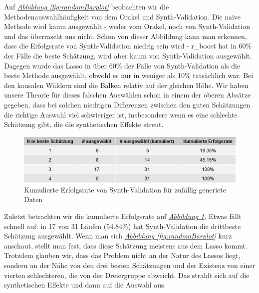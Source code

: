 \documentclass[12pt,a4paper,twoside]{scrartcl}
\numberwithin{equation}{section}
\newcommand{\reffig}[1]{\emph{\hyperref[#1]{Abbildung \ref*{#1}}}}
\begin{document}
\noindent
Auf \reffig{fig:randomBarplot} beobachten wir die Methodenauswahlhäufigkeit von dem Orakel und Synth-Validation. Die naive Methode wird kaum ausgewählt - weder vom Orakel, noch von Synth-Validation und das überrascht uns nicht. Schon von dieser Abbildung kann man erkennen, dass die Erfolgsrate von Synth-Validation niedrig sein wird - r\_boost hat in 60\% der Fälle die beste Schätzung, wird aber kaum von Synth-Validation ausgewählt. Dagegen wurde das Lasso in über 60\% der Fälle von Synth-Validation als die beste Methode ausgewählt, obwohl es nur in weniger als 10\% tatsächlich war. Bei den kausalen Wäldern sind die Balken relativ auf der gleichen Höhe. Wir haben unsere Theorie für dieses falschen Auswählen schon in einem der oberen Absätze gegeben, dass bei solchen niedrigen Differenzen zwischen den guten Schätzungen die richtige Auswahl viel schwieriger ist, insbesondere wenn es eine schlechte Schätzung gibt, die die synthetischen Effekte streut.\par   

\begin{center}
\begin{figure}[h]
    \centering
    \includegraphics[height=0.2\textwidth, width=1\textwidth]{figures/plots/randomGrid.jpeg}
    \vspace{1mm}
    \caption[Kumulierte Erfolgsrate von Synth-Validation für zufällig generiete Daten]{Kumulierte Erfolgsrate von Synth-Validation für zufällig generiete Daten}\label{fig:randomGrid}
  \end{figure}
\end{center}

\noindent
Zuletzt betrachten wir die kumulierte Erfolgsrate auf \reffig{fig:randomGrid}. Etwas fällt schnell auf: in 17 von 31 Läufen (54.84\%) hat Synth-Validation die drittbeste Schätzung ausgewählt. Wenn man sich \reffig{fig:randomBarplot} kurz anschaut, stellt man fest, dass diese Schätzung meistens aus dem Lasso kommt. Trotzdem glauben wir, dass das Problem nicht an der Natur des Lassos liegt, sondern an der Nähe von den drei besten Schätzungen und der Existenz von einer vierten schlechteren, die von der Dreiergruppe abweicht. Das strahlt sich auf die synthetischen Effekte und dann auf die Auswahl aus.\par
\end{document}
